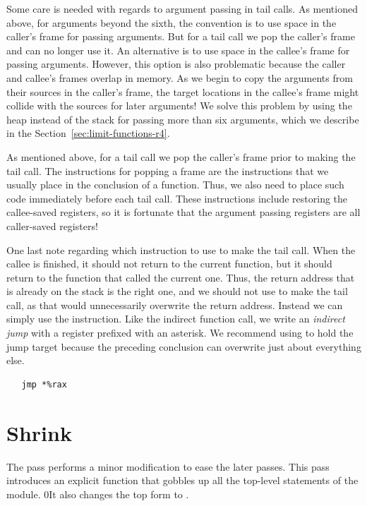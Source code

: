 \documentclass[7x10,nocrop]{TimesAPriori_MIT}%
\def\racketEd{0}
\def\edition{1}
\newcommand{\racket}[1]{{\if\edition\racketEd{#1}\fi}}
\begin{document}
Some care is needed with regards to argument passing in tail calls.
As mentioned above, for arguments beyond the sixth, the convention is
to use space in the caller's frame for passing arguments.  But for a
tail call we pop the caller's frame and can no longer use it.  An
alternative is to use space in the callee's frame for passing
arguments. However, this option is also problematic because the caller
and callee's frames overlap in memory.  As we begin to copy the
arguments from their sources in the caller's frame, the target
locations in the callee's frame might collide with the sources for
later arguments! We solve this problem by using the heap instead of
the stack for passing more than six arguments, which we describe in
the Section~\ref{sec:limit-functions-r4}.

As mentioned above, for a tail call we pop the caller's frame prior to
making the tail call. The instructions for popping a frame are the
instructions that we usually place in the conclusion of a
function. Thus, we also need to place such code immediately before
each tail call. These instructions include restoring the callee-saved
registers, so it is fortunate that the argument passing registers are
all caller-saved registers!

One last note regarding which instruction to use to make the tail
call. When the callee is finished, it should not return to the current
function, but it should return to the function that called the current
one. Thus, the return address that is already on the stack is the
right one, and we should not use  to make the tail call, as
that would unnecessarily overwrite the return address. Instead we can
simply use the  instruction. Like the indirect function call,
we write an \emph{indirect jump} with a
register prefixed with an asterisk.  We recommend using  to
hold the jump target because the preceding conclusion can overwrite
just about everything else.
\begin{lstlisting}
   jmp *%rax
\end{lstlisting}


\section{Shrink \LangFun{}}
\label{sec:shrink-r4}

The  pass performs a minor modification to ease the
later passes. This pass introduces an explicit  function
that gobbles up all the top-level statements of the module.
%
\racket{It also changes the top  form to
\code{ProgramDefs}.}
\end{document}
